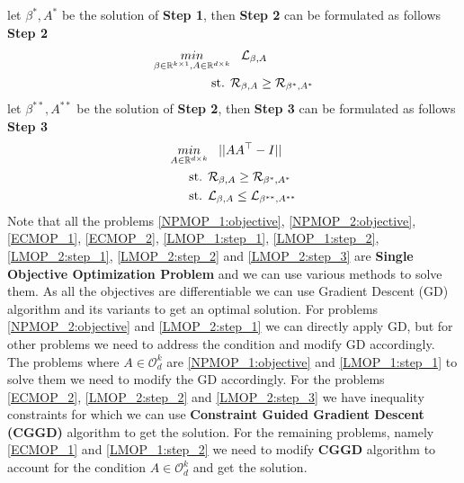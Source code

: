 let $\beta^{*}, A^{*}$ be the solution of \textbf{Step 1}, then \textbf{Step 2} can be formulated as follows
\newline \textbf{Step 2}
\begin{equation} \label{LMOP_2:step_2}
\begin{aligned}
    \underset{\beta\in \mathbb{R}^{k\times 1},A\in \mathbb{R}^{d\times k}}{min}& \hspace{3mm} \mathcal{L}_{\beta, A}\\
    \text{st.  }& \mathcal{R}_{\beta, A} \ge \mathcal{R}_{\beta^{*}, A^{*}}
\end{aligned}
\end{equation}
let $\beta^{**}, A^{**}$ be the solution of \textbf{Step 2}, then \textbf{Step 3} can be formulated as follows
\newline \textbf{Step 3}
\begin{equation} \label{LMOP_2:step_3}
\begin{aligned}
\underset{A\in \mathbb{R}^{d\times k}}{min}& \hspace{3mm} || AA^\top -I|| \\ 
\text{st.  }& \mathcal{R}_{\beta, A} \ge \mathcal{R}_{\beta^{*}, A^{*}}\\
\text{st.  }& \mathcal{L}_{\beta, A} \le \mathcal{L}_{\beta^{**}, A^{**}}\\
\end{aligned}
\end{equation}
\newline \newline Note that all the problems \ref{NPMOP_1:objective}, \ref{NPMOP_2:objective}, \ref{ECMOP_1}, \ref{ECMOP_2}, \ref{LMOP_1:step_1}, \ref{LMOP_1:step_2}, \ref{LMOP_2:step_1}, \ref{LMOP_2:step_2} and \ref{LMOP_2:step_3} are \textbf{Single Objective Optimization Problem} and we can use various methods to solve them. As all the objectives are differentiable we can use Gradient Descent (GD) algorithm and its variants to get an optimal solution. For problems \ref{NPMOP_2:objective} and \ref{LMOP_2:step_1} we can directly apply GD, but  for other problems we need to address the condition and modify GD accordingly. The problems where $A \in \mathcal{O}_d^k$ are \ref{NPMOP_1:objective} and \ref{LMOP_1:step_1} to solve them we need to modify the GD accordingly. For the problems \ref{ECMOP_2}, \ref{LMOP_2:step_2} and \ref{LMOP_2:step_3} we have inequality constraints for which we can use \textbf{Constraint Guided Gradient Descent (CGGD)} algorithm \cite{karsmakers2022constraint} to get the solution. For the remaining problems, namely \ref{ECMOP_1} and \ref{LMOP_1:step_2} we need to modify \textbf{CGGD} algorithm to account for the condition $A \in \mathcal{O}_d^k$ and get the solution.
